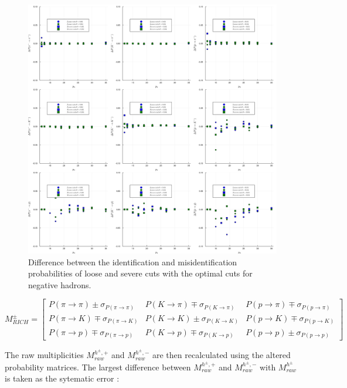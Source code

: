 \documentclass[letterpaper,12pt]{article}
\begin{document}
\begin{figure}[!p]
	\centering
	\includegraphics[scale=0.1]{./gfx/SysMinus.png}
	\caption{Difference between the identification and misidentification probabilities of loose and severe cuts with the optimal cuts for negative hadrons.}
	\label{Sysminus}
\end{figure}

\begin{equation}
  M^{\pm}_{RICH}
  =
  \begin{bmatrix}
  P(\pi \rightarrow \pi)\pm\sigma_{P(\pi \rightarrow \pi)} & P(K \rightarrow \pi)\mp\sigma_{P(K \rightarrow \pi)} & P(p \rightarrow \pi)\mp\sigma_{P(p \rightarrow \pi)}\\
  P(\pi \rightarrow K)\mp\sigma_{P(\pi \rightarrow K)} & P(K \rightarrow K)\pm\sigma_{P(K \rightarrow K)} & P(p \rightarrow K)\mp\sigma_{P(p \rightarrow K)} \\
  P(\pi \rightarrow p)\mp\sigma_{P(\pi \rightarrow p)} & P(K \rightarrow p)\mp\sigma_{P(K \rightarrow p)} & P(p \rightarrow p)\pm\sigma_{P(p \rightarrow p)}
  \end{bmatrix}
	\label{StatMat}
\end{equation}

The raw multiplicities $M^{h^{\pm},+}_{raw}$ and $M^{h^{\pm},-}_{raw}$ are then recalculated using the altered probability matrices. The largest difference between
$M^{h^{\pm},+}_{raw}$ and $M^{h^{\pm},-}_{raw}$ with $M^{h^{\pm}}_{raw}$ is taken as the sytematic error :
\end{document}
